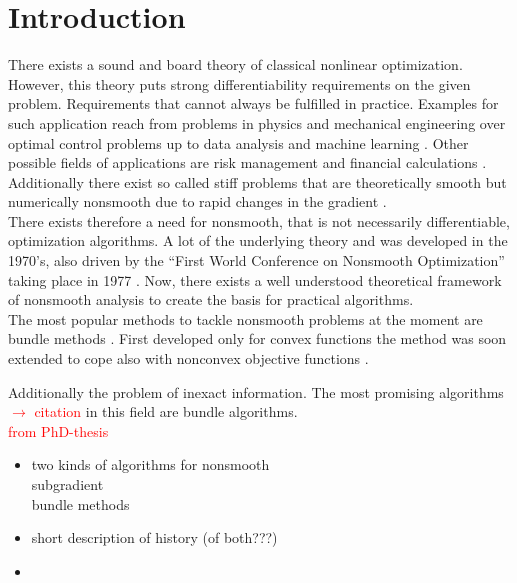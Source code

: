 \section{Introduction}

There exists a sound and board theory of classical nonlinear optimization. However, this theory puts strong differentiability requirements on the given problem. Requirements that cannot always be fulfilled in practice.
Examples for such application reach from problems in physics and mechanical engineering \cite{Clarke1990} over optimal control problems up to data analysis \cite{Bagirov2014} and machine learning \cite{Smola2007}.
Other possible fields of applications are risk management and financial calculations \cite{Nesterov2016,Teo2010}. 
Additionally there exist so called stiff problems that are theoretically smooth but numerically nonsmooth due to rapid changes in the gradient \cite{Maekelae1992}. \\
There exists therefore a need for nonsmooth, that is not necessarily differentiable, optimization algorithms. A lot of the underlying theory and was developed in the 1970's, also driven by the ``First World Conference on Nonsmooth Optimization'' taking place in 1977 \cite{Mifflin2012}.
Now, there exists a well understood theoretical framework of nonsmooth analysis to create the basis for practical algorithms. \\
The most popular methods to tackle nonsmooth problems at the moment are bundle methods \cite{Hare2016}. First developed only for convex functions \cite{Hiriart-Urruty1993} the method was soon extended to cope also with nonconvex objective functions \cite{Mifflin1982}.

Additionally the problem of inexact information. 
The most promising algorithms \textcolor{red}{\(\rightarrow\) citation}  in this field are bundle algorithms. \\
\textcolor{red}{from PhD-thesis}
\begin{itemize}
	\item two kinds of algorithms for nonsmooth \\
	subgradient \\
	bundle methods \\
	\item short description of history (of both???)
	\item 
\end{itemize}

